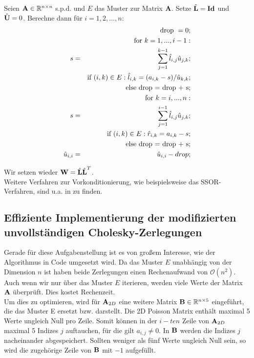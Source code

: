 Seien ${\textbf{A}} \in \mathbb{R}^{n \times n}$ s.p.d. und $E$ das Muster zur Matrix ${\textbf{A}}$. Setze $\hat{{\textbf{L}}} = {\textbf{Id}}$ und $\hat{{\textbf{U}}} = 0$. Berechne dann für $i=1,2,...,n$:
\begin{eqnarray}
&&\textnormal{drop } = 0;\notag\\
&&\textnormal{for } k = 1,...,i-1:\notag\\
s &=& \sum_{j=1}^{k-1} \hat l_{i,j} \hat u_{j,k};\notag\\
&&\textnormal{if } (i,k) \in E: \hat l_{i,k} = (a_{i,k} - s)/ \hat u_{k,k};\notag\\
&&\textnormal{else drop = drop + s};\notag \\
&&\textnormal{for } k = i,...,n: \notag \\
s &=& \sum_{j=1}^{i-1} \hat l_{i,j} \hat u_{j,k};\notag\\
&&\textnormal{if } (i,k) \in E: \hat r_{i,k} = a_{i,k} - s; \notag\\
&&\textnormal{else drop = drop + s};\notag \\
\hat u_{i,i} &=& \hat u_{i,i} -drop;
\end{eqnarray}

Wir setzen wieder ${\textbf{W}} = \hat{{\textbf{L}}} \hat{{\textbf{L}}}^{T}$. \\

Weitere Verfahren zur Vorkonditionierung, wie beispielsweise das SSOR-Verfahren, sind u.a. in \cite{SAAD5} zu finden.

\subsection{Effiziente Implementierung der modifizierten unvollständigen Cholesky-Zerlegungen}

Gerade für diese Aufgabenstellung ist es von großem Interesse, wie der Algorithmus in Code umgesetzt wird. Da das Muster $E$ unabhängig von der Dimension $n$ ist haben beide Zerlegungen einen Rechenaufwand von $\mathcal{O}(n^{2})$. Auch wenn wir nur über das Muster $E$ iterieren, werden viele Werte der Matrix ${\textbf{A}}$ überprüft. Dies kostet Rechenzeit.\\
Um dies zu optimieren, wird für ${\textbf{A}}_{2D}$ eine weitere Matrix ${\textbf{B}} \in \mathbb{R}^{n \times 5}$ eingeführt, die das Muster E ersetzt bzw. darstellt. Die 2D Poisson Matrix enthält maximal 5 Werte ungleich Null pro Zeile. Somit können in der $i - ten$ Zeile von ${\textbf{A}}_{2D}$ maximal 5 Indizes $j$ auftauchen, für die gilt $a_{i,j} \ne 0$. In ${\textbf{B}}$ werden die Indizes $j$ nacheinander abgespeichert. Sollten weniger als fünf Werte ungleich Null sein, so wird die zugehörige Zeile von ${\textbf{B}}$ mit $-1$ aufgefüllt.


